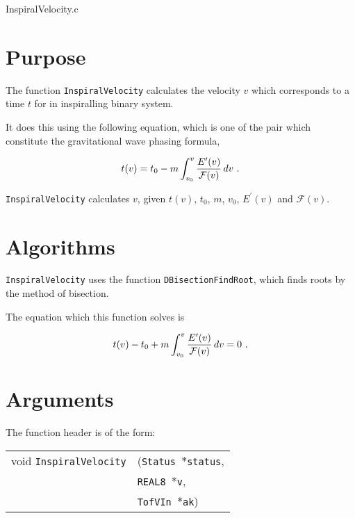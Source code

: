 \documentclass[12pt]{article}
\begin{document}
\huge
\begin{center}
InspiralVelocity.c
\end{center}
\normalsize
\vspace{10mm}

\section{Purpose}

The function \texttt{InspiralVelocity} calculates the velocity $v$ which corresponds to a time $t$ for in inspiralling binary system.

It does this using the following equation, which is one of the pair which constitute the gravitational wave phasing formula,

\begin{equation}
t(v) =  t_{0} - m \int_{v_{0}}^{v} \frac{E'(v)}{{\cal F}(v)} \, dv \,\,.
\label{tofv}
\end{equation}

\texttt{InspiralVelocity} calculates $v$, given $t(v)$, $t_{0}$, $m$, $v_{0}$, $E^{\prime}(v)$ and $\mathcal{F}(v)$.




\section{Algorithms}

\texttt{InspiralVelocity} uses the function \texttt{DBisectionFindRoot}, which finds roots by the method of bisection.

The equation which this function solves is 

\begin{equation}
t(v) - t_{0} + m \int_{v_{0}}^{v} \frac{E'(v)}{{\cal F}(v)} \, dv = 0 \,\,.
\label{tofv1}
\end{equation}

\section{Arguments}

The function header is of the form:

\vspace{5mm}

\begin{tabular}{ll}
void \texttt{InspiralVelocity}&(\texttt{Status $\ast$status},     \\
                                   &\texttt{REAL8 $\ast$v}, \\
                                   &\texttt{TofVIn $\ast$ak})
\end{tabular}
\end{document}
